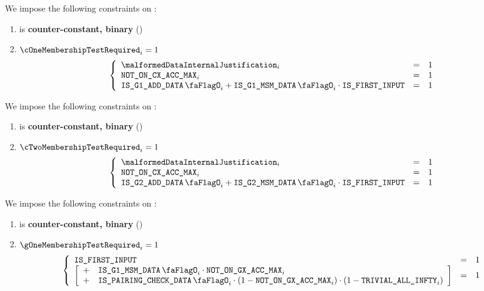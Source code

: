 We impose the following constraints on \cOneMembershipTestRequired{}:
\begin{enumerate}
    \item \cOneMembershipTestRequired{} is \textbf{counter-constant, binary} \quad (\trash)
    \item \If $\cOneMembershipTestRequired_{i} = 1$ \Then
        \[
            \left\{ \begin{array}{lcl}
                \malformedDataInternalJustification _{i} & = & 1 \\
                \notOnCXAccMax_{i}         & = & 1 \\
                \isBlsGOneAddData_{i} + \isBlsGOneMsmData_{i} \cdot \isFirstInput & = & 1 \\
            \end{array} \right.
        \]
\end{enumerate}
\noindent
We impose the following constraints on \cTwoMembershipTestRequired{}:
\begin{enumerate}
    \item \cTwoMembershipTestRequired{} is \textbf{counter-constant, binary} \quad (\trash)
    \item \If $\cTwoMembershipTestRequired_{i} = 1$ \Then
        \[
            \left\{ \begin{array}{lcl}
                \malformedDataInternalJustification _{i} & = & 1 \\
                \notOnCXAccMax_{i}         & = & 1 \\
                \isBlsGTwoAddData_{i} + \isBlsGTwoMsmData_{i} \cdot \isFirstInput & = & 1 \\
            \end{array} \right.
        \]
\end{enumerate}
\noindent
We impose the following constraints on \gOneMembershipTestRequired{}:
\begin{enumerate}
    \item \gOneMembershipTestRequired{} is \textbf{counter-constant, binary} \quad (\trash)
    \item \If $\gOneMembershipTestRequired_{i} = 1$ \Then
        \[
            \left\{ \begin{array}{lcl}
                \isFirstInput & = & 1 \\
                \left[ \begin{array}{cl}
                    + & \isBlsGOneMsmData_{i} \cdot \notOnGXAccMax_{i}  \\
                    + & \isBlsPairingCheckData_{i} \cdot (1 - \notOnGXAccMax_{i}) \cdot (1 - \trivialAllInf_{i}) \\
                \end{array} \right] & = & 1 \\
            \end{array} \right.
        \]
\end{enumerate}
